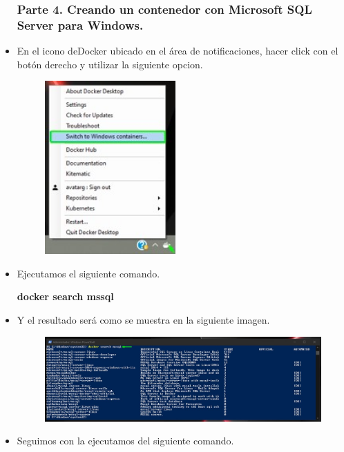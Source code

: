 \begin{itemize}
				\subsubsection{Parte 4. Creando un contenedor con Microsoft SQL Server para Windows.}
					\item En el icono deDocker ubicado en el área de notificaciones, hacer click con el botón derecho y utilizar la siguiente opcion.
						\begin{figure}[htb]
							\begin{center}
								\includegraphics[width=5cm]{./Imagenes/VerIconoDocker}
							\end{center}
						\end{figure}
					\item Ejecutamos el siguiente comando.
						\begin{center}
							\textbf{docker search mssql} \\
						\end{center}
					\item Y el resultado será como se muestra en la siguiente imagen.
						\begin{figure}[htb]						
							\begin{center}
								\includegraphics[width=19cm]{./Imagenes/Comando014}
							\end{center}
						\end{figure}
						\vspace{6cm}
					\item Seguimos con la ejecutamos del siguiente comando.

\end{itemize}
